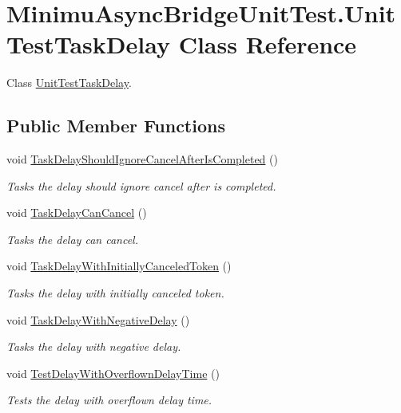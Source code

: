 \hypertarget{class_minimu_async_bridge_unit_test_1_1_unit_test_task_delay}{}\section{Minimu\+Async\+Bridge\+Unit\+Test.\+Unit\+Test\+Task\+Delay Class Reference}
\label{class_minimu_async_bridge_unit_test_1_1_unit_test_task_delay}


Class \hyperlink{class_minimu_async_bridge_unit_test_1_1_unit_test_task_delay}{Unit\+Test\+Task\+Delay}.  


\subsection*{Public Member Functions}
\begin{DoxyCompactItemize}
\item 
void \hyperlink{class_minimu_async_bridge_unit_test_1_1_unit_test_task_delay_afe95c9d5cb3b4422bd8eff3e81dccc0a}{Task\+Delay\+Should\+Ignore\+Cancel\+After\+Is\+Completed} ()
\begin{DoxyCompactList}\small\item\em Tasks the delay should ignore cancel after is completed. \end{DoxyCompactList}\item 
void \hyperlink{class_minimu_async_bridge_unit_test_1_1_unit_test_task_delay_abd8cf84636708a8e3d2fdec6727747e4}{Task\+Delay\+Can\+Cancel} ()
\begin{DoxyCompactList}\small\item\em Tasks the delay can cancel. \end{DoxyCompactList}\item 
void \hyperlink{class_minimu_async_bridge_unit_test_1_1_unit_test_task_delay_ae42e803996e0abd30a2d149fba073796}{Task\+Delay\+With\+Initially\+Canceled\+Token} ()
\begin{DoxyCompactList}\small\item\em Tasks the delay with initially canceled token. \end{DoxyCompactList}\item 
void \hyperlink{class_minimu_async_bridge_unit_test_1_1_unit_test_task_delay_a60ca04c75c9658fc652eb77b437e3755}{Task\+Delay\+With\+Negative\+Delay} ()
\begin{DoxyCompactList}\small\item\em Tasks the delay with negative delay. \end{DoxyCompactList}\item 
void \hyperlink{class_minimu_async_bridge_unit_test_1_1_unit_test_task_delay_a9005a1a924aed71eefa9c136b80076d1}{Test\+Delay\+With\+Overflown\+Delay\+Time} ()
\begin{DoxyCompactList}\small\item\em Tests the delay with overflown delay time. \end{DoxyCompactList}\end{DoxyCompactItemize}


